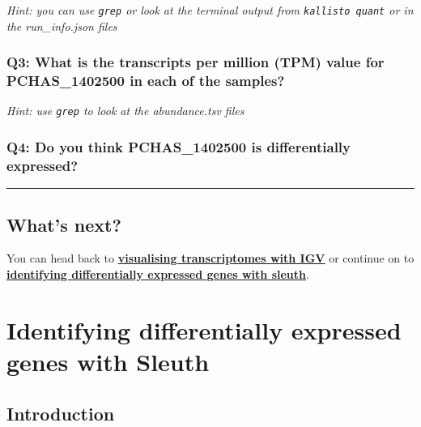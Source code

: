 \documentclass[11pt]{article}
\begin{document}
\textit{Hint: you can use \texttt{grep} or look at the terminal output
from \texttt{kallisto\ quant} or in the run\_info.json files}

\hypertarget{q3-what-is-the-transcripts-per-million-tpm-value-for-pchas_1402500-in-each-of-the-samples}{%
\subsubsection{Q3: What is the transcripts per million (TPM) value for
PCHAS\_1402500 in each of the
samples?}\label{q3-what-is-the-transcripts-per-million-tpm-value-for-pchas_1402500-in-each-of-the-samples}}

\textit{Hint: use \texttt{grep} to look at the abundance.tsv files}

\hypertarget{q4-do-you-think-pchas_1402500-is-differentially-expressed}{%
\subsubsection{Q4: Do you think PCHAS\_1402500 is differentially
expressed?}\label{q4-do-you-think-pchas_1402500-is-differentially-expressed}}

    \begin{center}\rule{0.5\linewidth}{.4pt}\end{center}

    \hypertarget{whats-next}{%
\subsection{What's next?}\label{whats-next}}

You can head back to
\textbf{\href{transcriptome-visualisation.ipynb}{visualising
transcriptomes with IGV}} or continue on to
\textbf{\href{sleuth-de.ipynb}{identifying differentially expressed
genes with sleuth}}.





\newpage





    \hypertarget{identifying-differentially-expressed-genes-with-sleuth}{%
\section{Identifying differentially expressed genes with
Sleuth}\label{identifying-differentially-expressed-genes-with-sleuth}}

    \hypertarget{introduction}{%
\subsection{Introduction}\label{introduction}}
\end{document}

